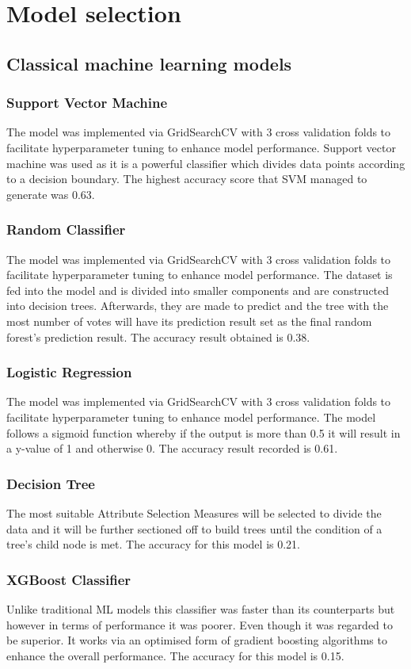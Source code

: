 \documentclass[11pt,a4paper]{article}
\begin{document}
	\clearpage
	\section{Model selection}
	
	\subsection{Classical machine learning models}
	
	\subsubsection{Support Vector Machine}
	The model was implemented via GridSearchCV with 3 cross validation folds to facilitate hyperparameter tuning to enhance model performance. Support vector machine was used as it is a powerful classifier which divides data points according to a decision boundary. The highest accuracy score that SVM managed to generate was 0.63.
	\subsubsection{Random Classifier}
	The model was implemented via GridSearchCV with 3 cross validation folds to facilitate hyperparameter tuning to enhance model performance. The dataset is fed into the model and is divided into smaller components and are constructed into decision trees. Afterwards, they are made to predict and the tree with the most number of votes will have its prediction result set as the final random forest’s prediction result. The accuracy result obtained is 0.38.
	\subsubsection{Logistic Regression}
	The model was implemented via GridSearchCV with 3 cross validation folds to facilitate hyperparameter tuning to enhance model performance. The model follows a sigmoid function whereby if the output is more than 0.5 it will result in a y-value of 1 and otherwise 0. The accuracy result recorded is 0.61.
	\subsubsection{Decision Tree}
	The most suitable Attribute Selection Measures will be selected to divide the data and it will be further sectioned off to build trees until the condition of a tree’s child node is met. The accuracy for this model is 0.21.
	\subsubsection{XGBoost Classifier}
	Unlike traditional ML models this classifier was faster than its counterparts but however in terms of performance it was poorer. Even though it was regarded to be superior. It works via an optimised form of gradient boosting algorithms to enhance the overall performance. The accuracy for this model is 0.15.
\end{document}
